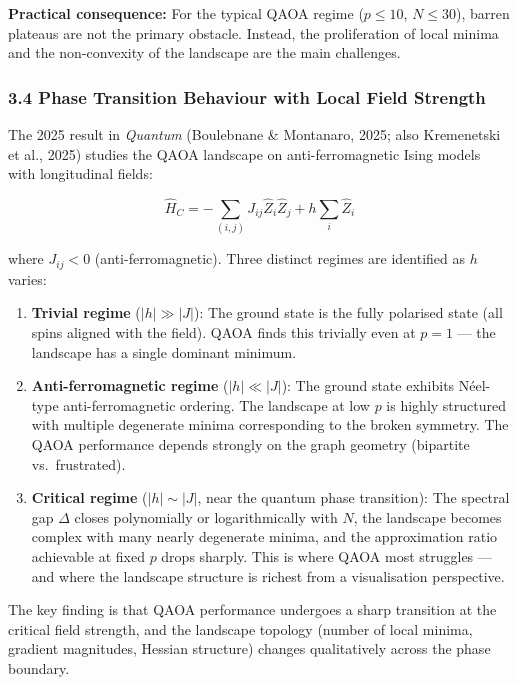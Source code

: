\documentclass[
  11pt,
]{report}
\begin{document}
\textbf{Practical consequence:} For the typical QAOA regime
(\(p \leq 10\), \(N \leq 30\)), barren plateaus are not the primary
obstacle. Instead, the proliferation of local minima and the
non-convexity of the landscape are the main challenges.

\subsubsection{3.4 Phase Transition Behaviour with Local Field
Strength}\label{phase-transition-behaviour-with-local-field-strength}

The 2025 result in \emph{Quantum} (Boulebnane \& Montanaro, 2025; also
Kremenetski et al., 2025) studies the QAOA landscape on
anti-ferromagnetic Ising models with longitudinal fields:

\[\hat{H}_C = -\sum_{(i,j)} J_{ij}\hat{Z}_i\hat{Z}_j + h\sum_i \hat{Z}_i\]

where \(J_{ij} < 0\) (anti-ferromagnetic). Three distinct regimes are
identified as \(h\) varies:

\begin{enumerate}
\def\labelenumi{\arabic{enumi}.}
\item
  \textbf{Trivial regime} (\(|h| \gg |J|\)): The ground state is the
  fully polarised state (all spins aligned with the field). QAOA finds
  this trivially even at \(p=1\) --- the landscape has a single dominant
  minimum.
\item
  \textbf{Anti-ferromagnetic regime} (\(|h| \ll |J|\)): The ground state
  exhibits Néel-type anti-ferromagnetic ordering. The landscape at low
  \(p\) is highly structured with multiple degenerate minima
  corresponding to the broken symmetry. The QAOA performance depends
  strongly on the graph geometry (bipartite vs.~frustrated).
\item
  \textbf{Critical regime} (\(|h| \sim |J|\), near the quantum phase
  transition): The spectral gap \(\Delta\) closes polynomially or
  logarithmically with \(N\), the landscape becomes complex with many
  nearly degenerate minima, and the approximation ratio achievable at
  fixed \(p\) drops sharply. This is where QAOA most struggles --- and
  where the landscape structure is richest from a visualisation
  perspective.
\end{enumerate}

The key finding is that QAOA performance undergoes a sharp transition at
the critical field strength, and the landscape topology (number of local
minima, gradient magnitudes, Hessian structure) changes qualitatively
across the phase boundary.
\end{document}
